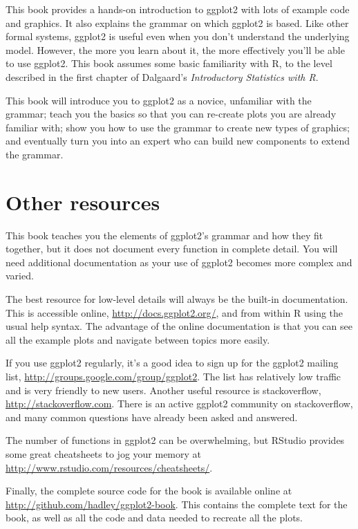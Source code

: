 This book provides a hands-on introduction to ggplot2 with lots of
example code and graphics. It also explains the grammar on which ggplot2
is based. Like other formal systems, ggplot2 is useful even when you
don't understand the underlying model. However, the more you learn about
it, the more effectively you'll be able to use ggplot2. This book
assumes some basic familiarity with R, to the level described in the
first chapter of Dalgaard's \emph{Introductory Statistics with R}.

This book will introduce you to ggplot2 as a novice, unfamiliar with the
grammar; teach you the basics so that you can re-create plots you are
already familiar with; show you how to use the grammar to create new
types of graphics; and eventually turn you into an expert who can build
new components to extend the grammar.

\section{Other resources}\label{sec:other-resources}

This book teaches you the elements of ggplot2's grammar and how they fit
together, but it does not document every function in complete detail.
You will need additional documentation as your use of ggplot2 becomes
more complex and varied.

The best resource for low-level details will always be the built-in
documentation. This is accessible online,
\url{http://docs.ggplot2.org/}, and from within R using the usual help
syntax. The advantage of the online documentation is that you can see
all the example plots and navigate between topics more easily.

If you use ggplot2 regularly, it's a good idea to sign up for the
ggplot2 mailing list, \url{http://groups.google.com/group/ggplot2}. The
list has relatively low traffic and is very friendly to new users.
Another useful resource is stackoverflow,
\url{http://stackoverflow.com}. There is an active ggplot2 community on
stackoverflow, and many common questions have already been asked and
answered.

The number of functions in ggplot2 can be overwhelming, but RStudio
provides some great cheatsheets to jog your memory at
\url{http://www.rstudio.com/resources/cheatsheets/}.

Finally, the complete source code for the book is available online at
\url{http://github.com/hadley/ggplot2-book}. This contains the complete
text for the book, as well as all the code and data needed to recreate
all the plots.

